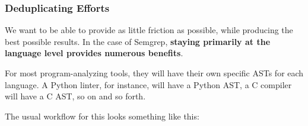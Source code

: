 \documentclass[aspectratio=169, handout]{beamer}
\begin{document}
 \begin{frame}[fragile]
   \frametitle{Deduplicating Efforts}

   We want to be able to provide as little friction as possible, while producing
   the best possible results. In the case of Semgrep, \textbf{staying primarily
   at the language level provides numerous benefits}.

   \pause
   \vspace{\fill}

   For most program-analyzing tools, they will have their own specific ASTs for
   each language. A Python linter, for instance, will have a Python AST, a C compiler
   will have a C AST, so on and so forth.

   \pause
   \vspace{\fill}

   The usual workflow for this looks something like this:
   \begin{center}
    \end{center}
\end{frame}
\end{document}
